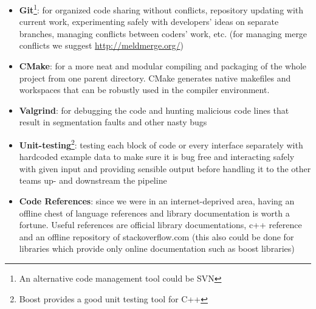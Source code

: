 \begin{itemize}
  \item \textbf{Git}\footnote{An alternative code management tool could be SVN}: for organized code sharing without conflicts, repository updating with current work, experimenting safely with developers' ideas on separate branches, managing conflicts between coders' work, etc. (for managing merge conflicts we suggest \href{meld}{http://meldmerge.org/})
  \item \textbf{CMake}: for a more neat and modular compiling and packaging of the whole project from one parent directory. CMake generates native makefiles and workspaces that can be robustly used in the compiler environment.
  \item \textbf{Valgrind}: for debugging the code and hunting malicious code lines that result in segmentation faults and other nasty bugs
  \item \textbf{Unit-testing}\footnote{Boost provides a good unit testing tool for C++}: testing each block of code or every interface separately with hardcoded example data to make sure it is bug free and interacting safely with given input and providing sensible output before handling it to the other teams up- and downstream the pipeline\label{unit_testing}
  \item \textbf{Code References}: since we were in an internet-deprived area, having an offline chest of language references and library documentation is worth a fortune. Useful references are official library documentations, c++ reference and an offline repository of stackoverflow.com (this also could be done for libraries which provide only online documentation such as boost libraries)
\end{itemize}